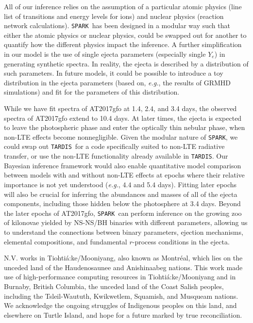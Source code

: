 \documentclass[twocolumn,twocolappendix]{aastex63}
\def\SPARK{\texttt{SPARK}}
\def\TARDIS{\texttt{TARDIS}}
\def\eg{{\it e.g.}}
\begin{document}
{{{{{{{{All of our inference relies on the assumption of a particular atomic physics (line list of transitions and energy levels for ions) and nuclear physics (reaction network calculations). \SPARK~has been designed in a modular way such that either the atomic physics or nuclear physics, could be swapped out for another to quantify how the different physics impact the inference. A further simplification in our model is the use of single ejecta parameters (especially single $Y_e$) in generating synthetic spectra. In reality, the ejecta is described by a distribution of such parameters. In future models, it could be possible to introduce a toy distribution in the ejecta parameters (based on, \eg, the results of GRMHD simulations) and fit for the parameters of this distribution.

While we have fit spectra of AT2017gfo at 1.4, 2.4, and 3.4 days, the observed spectra of AT2017gfo extend to 10.4 days. At later times, the ejecta is expected to leave the photospheric phase and enter the optically thin nebular phase, when non-LTE effects become nonnegligible. Given the modular nature of \SPARK, we could swap out \TARDIS~for a code specifically suited to non-LTE radiative transfer, or use the non-LTE functionality already available in \TARDIS. Our Bayesian inference framework would also enable quantitative model comparison between models with and without non-LTE effects at epochs where their relative importance is not yet understood (\eg, 4.4 and 5.4 days). Fitting later epochs will also be crucial for inferring the abundances and masses of all of the ejecta components, including those hidden below the photosphere at 3.4 days. Beyond the later epochs of AT2017gfo, \SPARK~can perform inference on the growing zoo of kilonovae yielded by NS-NS/BH binaries with different parameters, allowing us to understand the connections between binary parameters, ejection mechanisms, elemental compositions, and fundamental $r$-process conditions in the ejecta. 


\acknowledgments


N.V. works in Tiohti{\'a}:ke/Mooniyang, also known as Montr{\'e}al, which lies on the unceded land of the Haudenosaunee and Anishinaabeg nations. This work made use of high-performance computing resources in Tiohti{\'a}:ke/Mooniyang and in Burnaby, British Columbia, the unceded land of the Coast Salish peoples, including the Tsleil-Waututh, Kwikwetlem, Squamish, and Musqueam nations. We acknowledge the ongoing struggles of Indigenous peoples on this land, and elsewhere on Turtle Island, and hope for a future marked by true reconciliation.

}}}}}}}}
\end{document}
